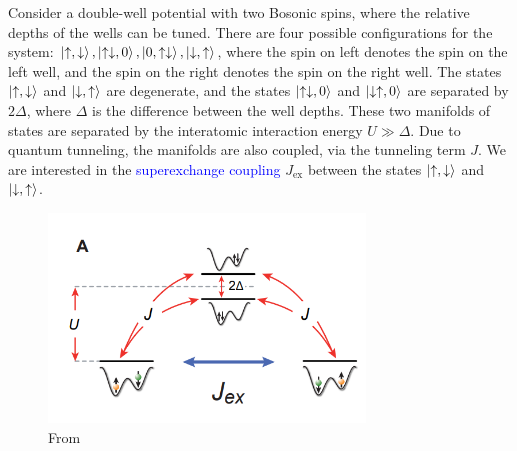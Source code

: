 \documentclass{book}
\theoremstyle{definition}
\begin{document}
Consider a double-well potential with two Bosonic spins, where the relative depths of the wells can be tuned. There are four possible configurations for the system: $\ket{\uparrow, \downarrow}, \ket{\uparrow\downarrow,0}, \ket{0,\uparrow\downarrow}, \ket{\downarrow, \uparrow}$, where the spin on left denotes the spin on the left well, and the spin on the right denotes the spin on the right well. The states $\ket{\uparrow,\downarrow}$ and $\ket{\downarrow,\uparrow}$ are degenerate, and the states $\ket{\uparrow\downarrow,0}$ and $\ket{\downarrow\uparrow,0}$ are separated by $2\Delta$, where $\Delta$ is the difference between the well depths. These two manifolds of states are separated by the interatomic interaction energy $U \gg \Delta$.  Due to quantum tunneling, the manifolds are also coupled, via the tunneling term $J$. We are interested in the \textcolor{blue}{superexchange coupling} $J_{\text{ex}}$ between the states $\ket{\uparrow,\downarrow}$ and $\ket{\downarrow, \uparrow}$. 



\begin{figure}[!htb]
	\centering
	\includegraphics[width=0.75\textwidth]{images/superex_1}
	\caption{From \cite{trotzky2008time}}
\end{figure} 
\end{document}
